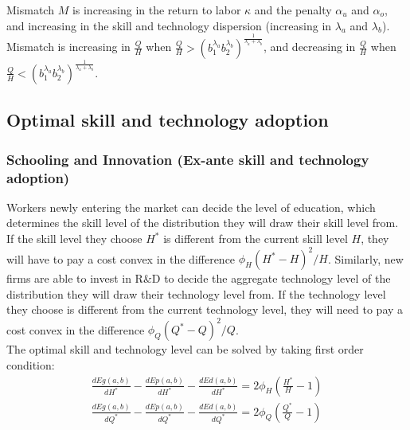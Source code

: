 \documentclass{article}
\newcommand{\1}{\mathbb{1}}
\begin{document}
Mismatch $M$ is increasing in the return to labor $\kappa$ and the penalty $\alpha_u$ and $\alpha_o$, and increasing in the skill and technology dispersion (increasing in $\lambda_a$ and $\lambda_b$). Mismatch is increasing in $\frac{Q}{H}$ when $\frac{Q}{H}>(b_1^{\lambda_a}b_2^{\lambda_b})^{\frac{1}{\lambda_a+\lambda_b}}$, and decreasing in $\frac{Q}{H}$ when $\frac{Q}{H}<(b_1^{\lambda_a}b_2^{\lambda_b})^{\frac{1}{\lambda_a+\lambda_b}}$. 

\subsection{Optimal skill and technology adoption}
\subsubsection*{Schooling and Innovation (Ex-ante skill and technology adoption)} 
Workers newly entering the market can decide the level of education, which determines the skill level of the distribution they will draw their skill level from. If the skill level they choose $H^*$ is different from the current skill level $H$, they will have to pay a cost convex in the difference $\phi_H(H^*-H)^2/H$. Similarly, new firms are able to invest in R\&D to decide the aggregate technology level of the distribution they will draw their technology level from. If the technology level they choose is different from the current technology level, they will need to pay a cost convex in the difference $\phi_Q(Q^*-Q)^2/Q$. \\

The optimal skill and technology level can be solved by taking first order condition: 
\begin{align*}
\frac{dEg(a,b)}{dH^*}-\frac{dEp(a,b)}{dH^*}-\frac{dEd(a,b)}{dH^*} =2\phi_H(\frac{H^*}{H}-1) \\
\frac{dEg(a,b)}{dQ^*}-\frac{dEp(a,b)}{dQ^*}-\frac{dEd(a,b)}{dQ^*} =2\phi_Q(\frac{Q^*}{Q}-1)
\end{align*}
\end{document}
